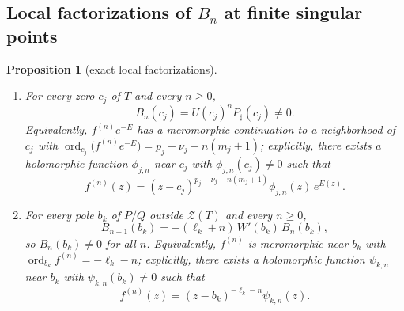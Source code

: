 \documentclass[reqno]{article}
\newtheorem{prop}[theorem]{Proposition}
\theoremstyle{definition}
\theoremstyle{remark}
\theoremstyle{plain}
\newcommand{\Z}{\mathcal Z}
\newcommand{\ord}{\operatorname{ord}}
\begin{document}
\subsection{Local factorizations of \texorpdfstring{$B_n$}{B\_n} at finite singular points}\label{sec:local}

\begin{prop}[exact local factorizations]\label{prop:local}
\begin{enumerate}
\item For every zero $c_j$ of $T$ and every $n\ge0$,
$$B_n(c_j)=U(c_j)^n P_\sharp(c_j)\ne0.$$
Equivalently, $f^{(n)}e^{-E}$ has a meromorphic continuation to a neighborhood of $c_j$ with $\ord_{c_j}\!\bigl(f^{(n)}e^{-E}\bigr)=p_j-\nu_j-n(m_j+1)$; explicitly, there exists a holomorphic function $\phi_{j,n}$ near $c_j$ with $\phi_{j,n}(c_j)\ne0$ such that
\begin{equation}\label{eq:localessentialorder}
f^{(n)}(z)=(z-c_j)^{p_j-\nu_j-n(m_j+1)}\phi_{j,n}(z)\,e^{E(z)}.
\end{equation}
\item For every pole $b_k$ of $P/Q$ outside $\Z(T)$ and every $n\ge0$,
$$B_{n+1}(b_k)=-(\ell_k+n)\,W'(b_k)\,B_n(b_k),$$
so $B_n(b_k)\ne0$ for all $n$. Equivalently, $f^{(n)}$ is meromorphic near $b_k$ with $\ord_{b_k}f^{(n)}=-\ell_k-n$; explicitly, there exists a holomorphic function $\psi_{k,n}$ near $b_k$ with $\psi_{k,n}(b_k)\ne0$ such that
\begin{equation}\label{eq:localpoleorder}
f^{(n)}(z)=(z-b_k)^{-\ell_k-n}\psi_{k,n}(z).
\end{equation}
\end{enumerate}
\end{prop}
\end{document}
